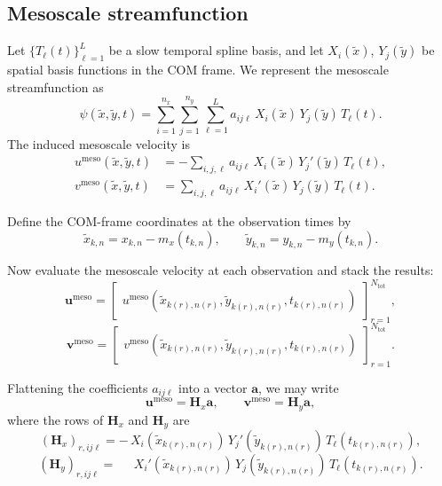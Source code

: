 \documentclass{article}
\begin{document}
\subsection{Mesoscale streamfunction}

Let $\{T_\ell(t)\}_{\ell=1}^{L}$ be a slow temporal spline basis, and let
$X_i(\tilde{x})$, $Y_j(\tilde{y})$ be spatial basis functions in the COM frame.
We represent the mesoscale streamfunction as
\begin{equation}
\psi(\tilde{x},\tilde{y},t)
=
\sum_{i=1}^{n_x}\sum_{j=1}^{n_y}\sum_{\ell=1}^{L}
a_{ij\ell}\,
X_i(\tilde{x})\,Y_j(\tilde{y})\,T_\ell(t).
\label{eq:psi_model}
\end{equation}
The induced mesoscale velocity is
\begin{align}
u^{\mathrm{meso}}(\tilde{x},\tilde{y},t)
&=
-\sum_{i,j,\ell}
a_{ij\ell}\,
X_i(\tilde{x})\,Y_j'(\tilde{y})\,T_\ell(t),
\label{eq:u_meso_model}
\\
v^{\mathrm{meso}}(\tilde{x},\tilde{y},t)
&=
\sum_{i,j,\ell}
a_{ij\ell}\,
X_i'(\tilde{x})\,Y_j(\tilde{y})\,T_\ell(t).
\label{eq:v_meso_model}
\end{align}

Define the COM-frame coordinates at the observation times by
\begin{equation}
\tilde{x}_{k,n}=x_{k,n}-m_x(t_{k,n}),
\qquad
\tilde{y}_{k,n}=y_{k,n}-m_y(t_{k,n}).
\label{eq:tilde_coords}
\end{equation}

Now evaluate the mesoscale velocity at each observation and stack the results:
\begin{equation}
\mathbf{u}^{\mathrm{meso}}=
\begin{bmatrix}
u^{\mathrm{meso}}(\tilde{x}_{k(r),n(r)},\tilde{y}_{k(r),n(r)},t_{k(r),n(r)})
\end{bmatrix}_{r=1}^{N_{\mathrm{tot}}},
\end{equation}
\begin{equation}
\mathbf{v}^{\mathrm{meso}}=
\begin{bmatrix}
v^{\mathrm{meso}}(\tilde{x}_{k(r),n(r)},\tilde{y}_{k(r),n(r)},t_{k(r),n(r)})
\end{bmatrix}_{r=1}^{N_{\mathrm{tot}}}.
\end{equation}

Flattening the coefficients $a_{ij\ell}$ into a vector $\mathbf{a}$, we may write
\begin{equation}
\mathbf{u}^{\mathrm{meso}}=\mathbf{H}_x \mathbf{a},
\qquad
\mathbf{v}^{\mathrm{meso}}=\mathbf{H}_y \mathbf{a},
\label{eq:Hxy_def}
\end{equation}
where the rows of $\mathbf{H}_x$ and $\mathbf{H}_y$ are
\begin{equation}
(\mathbf{H}_x)_{r,ij\ell}
=
-\,X_i(\tilde{x}_{k(r),n(r)})\,Y_j'(\tilde{y}_{k(r),n(r)})\,T_\ell(t_{k(r),n(r)}),
\end{equation}
\begin{equation}
(\mathbf{H}_y)_{r,ij\ell}
=
\phantom{-}\,X_i'(\tilde{x}_{k(r),n(r)})\,Y_j(\tilde{y}_{k(r),n(r)})\,T_\ell(t_{k(r),n(r)}).
\end{equation}
\end{document}
